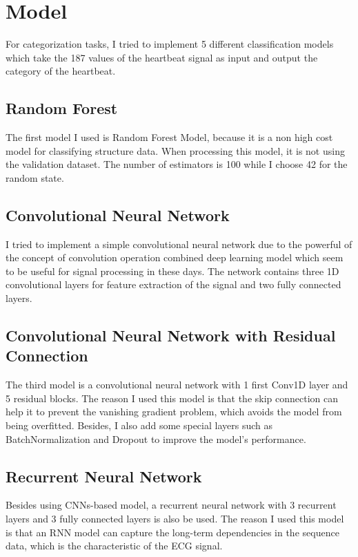 \documentclass{article}
\begin{document}
\section{Model}
For categorization tasks, I tried to implement 5 different classification models which 
take the 187 values of the heartbeat signal as input and output the category of the heartbeat.
\subsection{Random Forest}
The first model I used is Random Forest Model,
because it is a non high cost model for classifying structure data. 
When processing this model, it is not using the validation dataset.
The number of estimators is 100 while I choose 42 for the random state.


\subsection{Convolutional Neural Network}
I tried to implement a simple convolutional neural network due to 
the powerful of the concept of convolution operation combined deep learning model which seem to be
useful for signal processing in these days. The network contains three 1D convolutional layers 
for feature extraction of the signal and two fully connected layers.

\subsection{Convolutional Neural Network with Residual Connection}
The third model is a convolutional neural network with 1 first Conv1D layer and 5 residual blocks. 
The reason I used this model is that the skip connection can help it to prevent the vanishing gradient 
problem, which avoids the model from being overfitted. Besides, I also add some special layers such as
BatchNormalization and Dropout to improve the model's performance.

\subsection{Recurrent Neural Network}
Besides using CNNs-based model, a recurrent neural network with 3 recurrent layers and 3 fully connected layers
is also be used. The reason I used this model is that an RNN model can capture the long-term dependencies in the 
sequence data, which is the characteristic of the ECG signal. 
\end{document}
